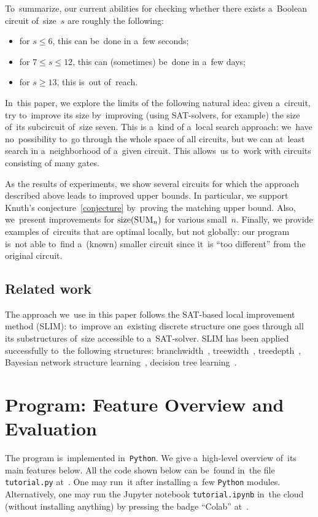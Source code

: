 To~summarize, our current abilities for checking whether there exists a~Boolean circuit of~size~$s$ are roughly the following:
\begin{itemize}
\item for $s \le 6$, this can be~done in a~few seconds;
\item for $7 \le s \le 12$, this can (sometimes)
be~done in a~few days;
\item for $s \ge 13$, this is~out of~reach.
\end{itemize}

In~this paper, we explore the limits of the following natural idea: given a~circuit, try to~improve its size by~improving (using SAT-solvers, for example) the size
of~its subcircuit of~size seven. This is a~kind of a~local search approach: we~have no~possibility to~go through the whole space of all circuits, but we can at~least
search in a~neighborhood of a~given circuit.
This allows~us to~work with circuits consisting
of many gates.

As the results of experiments, we show several circuits
for which the approach described above leads to improved upper bounds. In particular, we support Knuth's conjecture~\eqref{conjecture} by~proving the matching upper bound.
Also, we~present improvements for $\operatorname{size}(\operatorname{SUM}_n)$ for various small~$n$.
Finally, we provide examples of~circuits that are
optimal locally, but not globally: our program
is~not able to~find a~(known) smaller circuit since
it~is
``too different'' from the original circuit.

\subsection*{Related work}
The approach we~use in this paper follows the SAT-based
local improvement method (SLIM): to~improve an~existing
discrete structure one goes through all its substructures
of~size accessible to a~SAT-solver.
SLIM has been applied successfully to~the following
structures:
branchwidth~\cite{DBLP:journals/tocl/LodhaOS19},
treewidth~\cite{DBLP:conf/sat/FichteLS17},
treedepth~\cite{DBLP:conf/cp/RamaswamyS20},
Bayesian network structure learning~\cite{AAAI1},
decision tree learning~\cite{AAAI2}.

\section{Program: Feature Overview and Evaluation}
The program is~implemented in~\texttt{Python}.
We give a~high-level overview of~its main features below.
All the code shown below
can be~found in~the
file \texttt{tutorial.py} at~\cite{git-improvement}.
One may run~it after installing a~few \texttt{Python} modules. Alternatively, one may run the Jupyter notebook
\texttt{tutorial.ipynb} in~the cloud (without installing
anything) by pressing the badge ``Colab''
at~\cite{git-improvement}.

